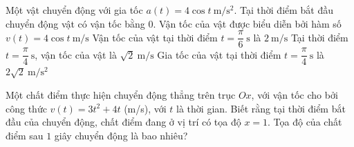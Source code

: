 \begin{ex}%
	Một vật chuyển động với gia  tốc $a(t)=4\cos t~\mathrm{m/s^2}$. Tại thời điểm bắt đầu chuyển động vật có vận tốc bằng $0$.
	 \choiceTF
		{Vận tốc của vật được biểu diễn  bởi hàm số $v(t)=4\cos t~\mathrm{m/s}$}
		 {\True Vận tốc của vật tại thời điểm $t=\dfrac{\pi}{6}~\mathrm{s}$ là $2~\mathrm{m/s}$}
		{Tại thời điểm $t=\dfrac{\pi}{4}~\mathrm{s}$, vận tốc của  vật là $\sqrt{2}~\mathrm{m/s}$}
		{\True  Gia tốc của vật tại thời điểm $t=\dfrac{\pi}{4}~\mathrm{s}$ là $2\sqrt{2}~\mathrm{m/s^2}$}
\end{ex}

\begin{bt}%
	Một chất điểm thực hiện chuyển động thẳng trên trục $Ox$, với vận tốc cho bởi công thức $v(t) = 3t^2 + 4t$ (m/s), với $t$ là thời gian. Biết rằng tại thời điểm bắt đầu của chuyển động, chất điểm đang ở vị trí có tọa độ $x = 1$. Tọa độ của chất điểm sau $1$ giây chuyển  động là bao nhiêu?
\end{bt}

